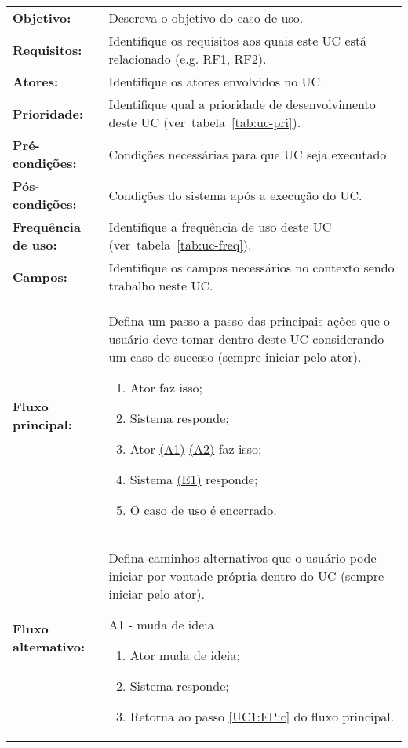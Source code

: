 \documentclass[12pt,openright,a4paper,brazil]{abntex2}
\begin{document}
\begin{longtable}{p{.25\linewidth}p{.7\linewidth}}
\textbf{Objetivo:} & Descreva o objetivo do caso de uso. \\
\textbf{Requisitos:} & Identifique os requisitos aos quais este UC está relacionado (e.g. RF1, RF2). \\
\textbf{Atores:} & Identifique os atores envolvidos no UC. \\
\textbf{Prioridade:} & Identifique qual a prioridade de desenvolvimento deste UC (ver~tabela~\ref{tab:uc-pri}). \\
\textbf{Pré-condições:} & Condições necessárias para que UC seja executado. \\
\textbf{Pós-condições:} & Condições do sistema após a execução do UC. \\
\textbf{Frequência de uso: } & Identifique a frequência de uso deste UC (ver~tabela~\ref{tab:uc-freq}).\\
\textbf{Campos:} & Identifique os campos necessários no contexto sendo trabalho neste UC. \\
\textbf{Fluxo principal:} & 
Defina um passo-a-passo das principais ações que o usuário deve tomar dentro deste UC considerando um caso de sucesso (sempre iniciar pelo ator).
\begin{enumerate}[label=\alph*)]
	\item \label{UC1:FP:a} Ator faz isso;
	\item Sistema responde;
	\item \label{UC1:FP:c} Ator \hyperref[UC1:FA:A1]{(A1)} \hyperref[UC1:FA:A2]{(A2)} faz isso;
	\item Sistema \hyperref[UC1:FE:E1]{(E1)} responde;
	\item O caso de uso é encerrado.
\end{enumerate} \\
\textbf{Fluxo alternativo:} & 
Defina caminhos alternativos que o usuário pode iniciar por vontade própria dentro do UC (sempre iniciar pelo ator).
\vspace{\onelineskip}

\label{UC1:FA:A1} A1 - muda de ideia
\begin{enumerate}[label=\alph*)]
	\item Ator muda de ideia;
	\item Sistema responde;
	\item Retorna ao passo \ref{UC1:FP:c} do fluxo principal.
\end{enumerate} 


\end{longtable}
\end{document}

